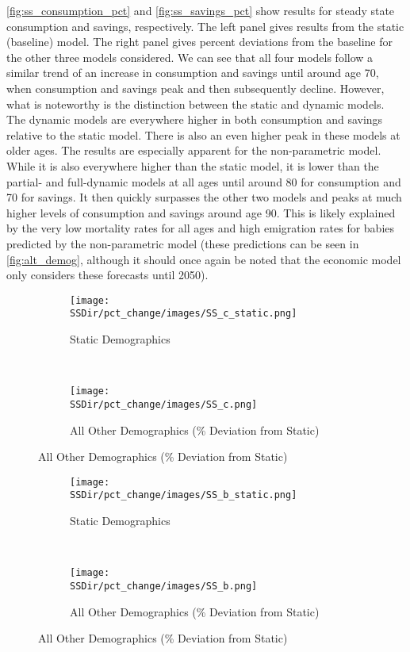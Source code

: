 \documentclass[10pt]{article}
\numberwithin{equation}{subsection}
\newcommand*{\SSDir}{../../code/Rick/OUTPUT/SS}
\begin{document}
\par \autoref{fig:ss_consumption_pct} and \autoref{fig:ss_savings_pct} show results for steady state consumption and savings, respectively. The left panel gives results from the static (baseline) model. The right panel gives percent deviations from the baseline for the other three models considered. We can see that all four models follow a similar trend of an increase in consumption and savings until around age 70, when consumption and savings peak and then subsequently decline. However, what is noteworthy is the distinction between the static and dynamic models. The dynamic models are everywhere higher in both consumption and savings relative to the static model. There is also an even higher peak in these models at older ages. The results are especially apparent for the non-parametric model. While it is also everywhere higher than the static model, it is lower than the partial- and full-dynamic models at all ages until around 80 for consumption and 70 for savings. It then quickly surpasses the other two models and peaks at much higher levels of consumption and savings around age 90. This is likely explained by the very low mortality rates for all ages and high emigration rates for babies predicted by the non-parametric model (these predictions can be seen in \autoref{fig:alt_demog}, although it should once again be noted that the economic model only considers these forecasts until 2050).

\begin{figure}[H]
   \caption{\label{fig:ss_consumption_pct}Steady State Consumption}
   \begin{subfigure}{0.5\textwidth}
      \centering
      \texttt{[image: \\SSDir/pct\_change/images/SS\_c\_static.png]}
      \caption{Static Demographics}
   \end{subfigure}%
   ~
   \begin{subfigure}{0.5\textwidth}
      \centering
      \texttt{[image: \\SSDir/pct\_change/images/SS\_c.png]}
      \caption{All Other Demographics (\% Deviation from Static)}
   \end{subfigure}
\end{figure}

\begin{figure}[H]
   \caption{\label{fig:ss_savings_pct}Steady State Savings}
   \begin{subfigure}{0.5\textwidth}
      \centering
      \texttt{[image: \\SSDir/pct\_change/images/SS\_b\_static.png]}
      \caption{Static Demographics}
   \end{subfigure}%
   ~
   \begin{subfigure}{0.5\textwidth}
      \centering
      \texttt{[image: \\SSDir/pct\_change/images/SS\_b.png]}
      \caption{All Other Demographics (\% Deviation from Static)}
   \end{subfigure}
\end{figure}
\end{document}
